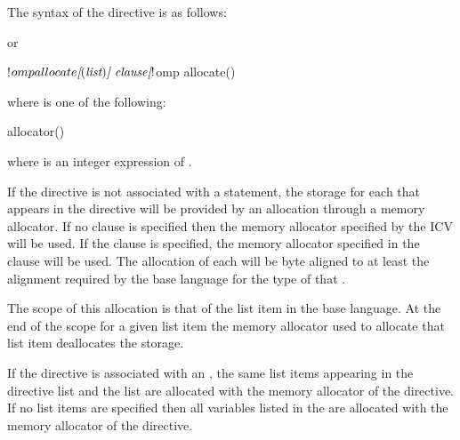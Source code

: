 \begin{fortranspecific}
The syntax of the  directive is as follows:


or
\begin{ompfPragma}
!$omp allocate\plc{[}()\plc{] clause}
\plc{[}!$omp allocate() 
\plc{[...]]}
\end{ompfPragma} %

where  is one of the following:

\begin{indentedcodelist}
allocator()
\end{indentedcodelist}

where  is an integer expression of  .

\end{fortranspecific}

\descr

If the directive is not associated with a statement, the storage for each 
 that appears in the directive will be provided by an allocation 
through a memory allocator. If no clause is specified then the memory allocator 
specified by the  ICV will be used. If the  
clause is specified, the memory allocator specified in the clause will be used. 
The allocation of each  
will be byte aligned to at least the alignment required by the
base language for the type of that .

The scope of this allocation is that of the list item in the base language. At 
the end of the scope for a given list item the memory allocator used to allocate 
that list item deallocates the storage.

\begin{fortranspecific}
If the directive is associated with an , the same list 
items appearing in the directive list and the  list are 
allocated with the memory allocator of the directive. If no list items are 
specified then all variables listed in the  are 
allocated with the memory allocator of the directive.
\end{fortranspecific}

